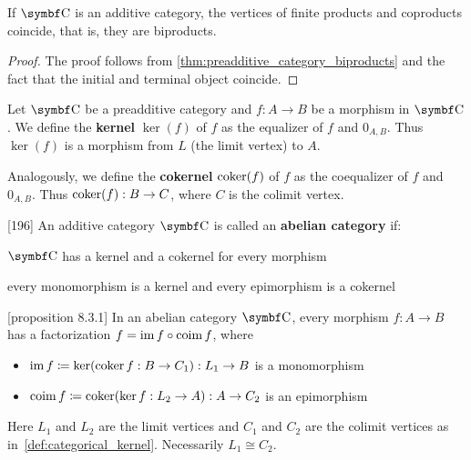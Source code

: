 \begin{theorem}\label{thm:additive_category_biproducts}
  If \( \Bold C \) is an additive category, the vertices of finite products and coproducts coincide, that is, they are biproducts.
\end{theorem}
\begin{proof}
  The proof follows from \cref{thm:preadditive_category_biproducts} and the fact that the initial and terminal object coincide.
\end{proof}

\begin{definition}\label{def:categorical_kernel}
  Let \( \Bold C \) be a preadditive category and \( f: A \to B \) be a morphism in \( \Bold C \). We define the \textbf{kernel} \( \ker(f) \) of \( f \) as the equalizer of \( f \) and \( 0_{A,B} \). Thus \( \ker(f) \) is a morphism from \( L \) (the limit vertex) to \( A \).

  Analogously, we define the \textbf{cokernel} \( \operatorname{coker}(f) \) of \( f \) as the coequalizer of \( f \) and \( 0_{A,B} \). Thus \( \operatorname{coker}(f): B \to C \), where \( C \) is the colimit vertex.
\end{definition}

\begin{definition}\label{def:abelian_category}\cite{MacLane1994}[196]
  An additive category \( \Bold C \) is called an \textbf{abelian category} if:
  \begin{defenum}
    \item \( \Bold C \) has a kernel and a cokernel for every morphism
    \item every monomorphism is a kernel and every epimorphism is a cokernel
  \end{defenum}
\end{definition}

\begin{proposition}\label{def:abelian_category_morphism_factorization}\cite{MacLane1994}[proposition 8.3.1]
  In an abelian category \( \Bold C \), every morphism \( f: A \to B \) has a factorization \( f = \operatorname{im} f \circ \operatorname{coim} f \), where
  \begin{itemize}
    \item \( \operatorname{im} f \coloneqq \ker(\operatorname{coker} f: B \to C_1): L_1 \to B \) is a monomorphism
    \item \( \operatorname{coim} f \coloneqq \operatorname{coker}(\ker f: L_2 \to A): A \to C_2 \) is an epimorphism
  \end{itemize}
  Here \( L_1 \) and \( L_2 \) are the limit vertices and \( C_1 \) and \( C_2 \) are the colimit vertices as in~\cref{def:categorical_kernel}. Necessarily \( L_1 \cong C_2 \).
\end{proposition}

